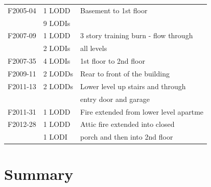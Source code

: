\documentclass[12pt,oneside]{book}
\begin{document}
\begin{table}[!ht]
\begin{tabular}{lll}
F2005-04 \cite{NIOSH:McFall4}       &  1 LODD             &  Basement to 1st floor                   \\
                                    &  9 LODIs            &                                          \\
F2007-09 \cite{NIOSH:Tarley}        &  1 LODD             &  3 story training burn - flow through    \\
                                    &  2 LODIs            &  all levels                              \\
F2007-35 \cite{NIOSH:Braddee}       &  4 LODIs            &  1st floor to 2nd floor                  \\
F2009-11 \cite{NIOSH:Merinar}       &  2 LODDs            &  Rear to front of the building           \\
F2011-13 \cite{NIOSH:Bowyer2}       &  2 LODDs            &  Lower level up stairs and through       \\
                                    &                     &  entry door and garage                   \\
F2011-31 \cite{NIOSH:Loflin}        &  1 LODD             &  Fire extended from lower level apartme  \\
F2012-28 \cite{NIOSH:Bowyer}        &  1 LODD             &  Attic fire extended into closed         \\
                                    &  1 LODI             &  porch and then into 2nd floor           \\
\bottomrule
\end{tabular}
\label{tab:LODD}
\end{table}


\chapter{Summary}
\label{sec:summary}

\end{document}
